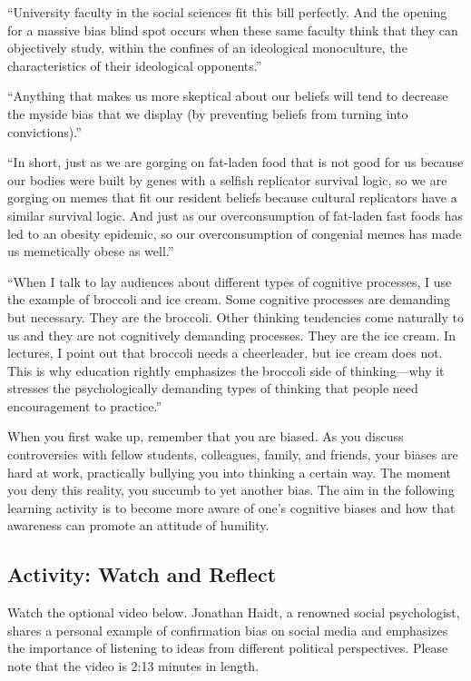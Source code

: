 \documentclass[
]{book}
\begin{document}
``University faculty in the social sciences fit this bill perfectly. And the opening for a massive bias blind spot occurs when these same faculty think that they can objectively study, within the confines of an ideological monoculture, the characteristics of their ideological opponents.''

``Anything that makes us more skeptical about our beliefs will tend to decrease the myside bias that we display (by preventing beliefs from turning into convictions).''

``In short, just as we are gorging on fat-laden food that is not good for us because our bodies were built by genes with a selfish replicator survival logic, so we are gorging on memes that fit our resident beliefs because cultural replicators have a similar survival logic. And just as our overconsumption of fat-laden fast foods has led to an obesity epidemic, so our overconsumption of congenial memes has made us memetically obese as well.''

``When I talk to lay audiences about different types of cognitive processes, I use the example of broccoli and ice cream. Some cognitive processes are demanding but necessary. They are the broccoli. Other thinking tendencies come naturally to us and they are not cognitively demanding processes. They are the ice cream. In lectures, I point out that broccoli needs a cheerleader, but ice cream does not. This is why education rightly emphasizes the broccoli side of thinking---why it stresses the psychologically demanding types of thinking that people need encouragement to practice.''

When you first wake up, remember that you are biased. As you discuss controversies with fellow students, colleagues, family, and friends, your biases are hard at work, practically bullying you into thinking a certain way. The moment you deny this reality, you succumb to yet another bias. The aim in the following learning activity is to become more aware of one's cognitive biases and how that awareness can promote an attitude of humility.

\hypertarget{activity-watch-and-reflect-3}{%
\subsection*{Activity: Watch and Reflect}\label{activity-watch-and-reflect-3}}

Watch the optional video below. Jonathan Haidt, a renowned social psychologist, shares a personal example of confirmation bias on social media and emphasizes the importance of listening to ideas from different political perspectives. Please note that the video is 2:13 minutes in length.
\end{document}
